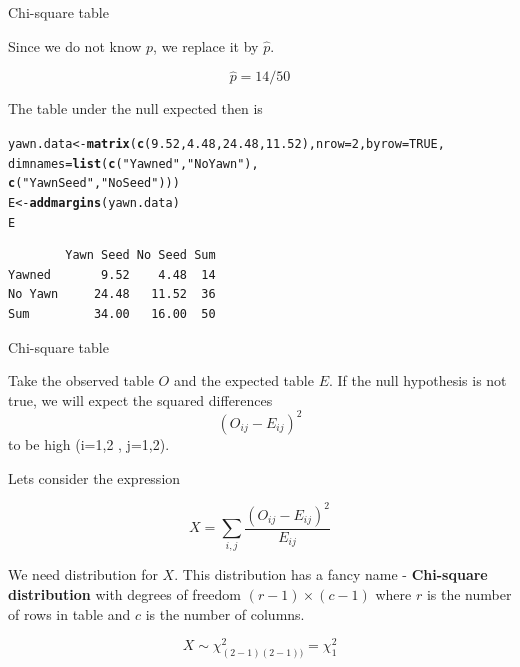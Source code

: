 \documentclass{beamer}\usepackage[]{graphicx}\usepackage[]{color}
\makeatletter
\newcommand{\hlnum}[1]{\textcolor[rgb]{0.2,0.2,0.2}{#1}}%
\newcommand{\hlstr}[1]{\textcolor[rgb]{0.2,0.2,0.2}{#1}}%
\newcommand{\hlstd}[1]{\textcolor[rgb]{0.102,0.102,0.102}{#1}}%
\newcommand{\hlkwb}[1]{\textcolor[rgb]{0.102,0.102,0.102}{#1}}%
\newcommand{\hlkwc}[1]{\textcolor[rgb]{0.2,0.2,0.2}{#1}}%
\newcommand{\hlkwd}[1]{\textcolor[rgb]{0.102,0.102,0.102}{\textbf{#1}}}%
\newenvironment{kframe}{%
 \def\at@end@of@kframe{}%
 \ifinner\ifhmode%
  \def\at@end@of@kframe{\end{minipage}}%
  \begin{minipage}{\columnwidth}%
 \fi\fi%
 \def\FrameCommand##1{\hskip\@totalleftmargin \hskip-\fboxsep
 \colorbox{shadecolor}{##1}\hskip-\fboxsep
     \hskip-\linewidth \hskip-\@totalleftmargin \hskip\columnwidth}%
 \MakeFramed {\advance\hsize-\width
   \@totalleftmargin\z@ \linewidth\hsize
   \@setminipage}}%
 {\par\unskip\endMakeFramed%
 \at@end@of@kframe}
\newenvironment{knitrout}{}{} %
\renewenvironment{knitrout}{\begin{spacing}{0.75}\begin{tiny}}{\end{tiny}\end{spacing}}
\makeatother
\begin{document}
\begin{frame}[fragile]{Chi-square table}

Since we do not know $p$, we replace it by $\hat{p}$.

$$ \hat{p} = 14/50 $$ \pause

The table under the null expected then is

\begin{knitrout}\small
{}\color{fgcolor}\begin{kframe}
\begin{alltt}
\hlstd{yawn.data} \hlkwb{<-} \hlkwd{matrix}\hlstd{(}\hlkwd{c}\hlstd{(}\hlnum{9.52}\hlstd{,}\hlnum{4.48}\hlstd{,}\hlnum{24.48}\hlstd{,}\hlnum{11.52}\hlstd{),} \hlkwc{nrow}\hlstd{=}\hlnum{2}\hlstd{,} \hlkwc{byrow}\hlstd{=}\hlnum{TRUE}\hlstd{,}
                \hlkwc{dimnames} \hlstd{=} \hlkwd{list}\hlstd{(}\hlkwd{c}\hlstd{(}\hlstr{"Yawned"}\hlstd{,} \hlstr{"No Yawn"}\hlstd{),}
                                \hlkwd{c}\hlstd{(}\hlstr{"Yawn Seed"}\hlstd{,} \hlstr{"No Seed"}\hlstd{)))}
\hlstd{E} \hlkwb{<-}  \hlkwd{addmargins}\hlstd{(yawn.data)}
\hlstd{E}
\end{alltt}
\begin{verbatim}
        Yawn Seed No Seed Sum
Yawned       9.52    4.48  14
No Yawn     24.48   11.52  36
Sum         34.00   16.00  50
\end{verbatim}
\end{kframe}
\end{knitrout}


\end{frame}

\begin{frame}[fragile]{Chi-square table}

Take the observed table $O$ and the expected table $E$. If the null hypothesis is not true, we will expect the squared differences $$ (O_{ij} - E_{ij})^2 $$ to be high (i=1,2 , j=1,2). \pause

Lets consider the expression 

$$ X = \sum_{i,j} \frac{(O_{ij}-E_{ij})^2}{E_{ij}} $$

We need  distribution for  $X$. This distribution has a fancy name - \textbf{Chi-square distribution} with degrees of freedom $(r-1) \times (c-1)$ where $r$ is the number of rows in table and $c$ is the number of columns. 

$$  X \sim \chi^2_{(2-1)(2-1))} = \chi^2_{1} $$

\end{frame}
\end{document}
